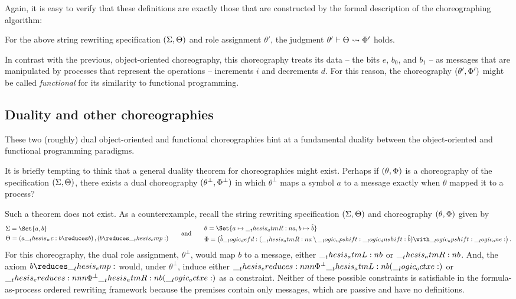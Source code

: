 Again, it is easy to verify that these definitions are exactly those that are constructed by the formal description of the choreographing algorithm:
\begin{proposition}
  For the above string rewriting specification $(\Sigma, \Theta)$ and role assignment $\theta'$, the judgment $\theta' \vdash \Theta \rightsquigarrow \Phi'$ holds.
\end{proposition}

In contrast with the previous, object-oriented choreography, this choreography treats its data -- the bits $e$, $b_0$, and $b_1$ -- as messages that are manipulated by processes that represent the operations -- increments $i$ and decrements $d$.
For this reason, the choreography $(\theta', \Phi')$ might be called \emph{functional} for its similarity to functional programming.

\clearpage
\subsection{Duality and other choreographies}

These two (roughly) dual object-oriented and functional choreographies hint at a fundamental duality between the object-oriented and functional programming paradigms.

It is briefly tempting to think that a general duality theorem for choreographies might exist.
Perhaps if $(\theta, \Phi)$ is a choreography of the specification $(\Sigma, \Theta)$, there exists a dual choreography $(\theta^{\bot}, \Phi^{\bot})$ in which $\theta^{\bot}$ maps a symbol $a$ to a message exactly when $\theta$ mapped it to a process?

Such a theorem does not exist.
As a counterexample, recall the string rewriting specification $(\Sigma, \Theta)$ and choreography $(\theta, \Phi)$ given by
\begin{equation*}
  \begin{lgathered}
    \sralph = \Set{a, b} \\
    \srsig = (a \wc b \reduces b) \,, (b \reduces \emp)
  \end{lgathered}
  \qquad\text{and}\qquad
  \begin{lgathered}
    \theta = \Set{ a \mapsto \atmR{a} , b \mapsto \defp{b} } \\
    \orsig = \bigl(\defp{b} \defd (\atmR{a} \limp \up \dn \defp{b}) \with \up \one\bigr)
    \,.
  \end{lgathered}
\end{equation*}
For this choreography, the dual role assignment, $\theta^{\bot}$, would map $b$ to a message, either $\__thesis_atmL:n {b}$ or $\__thesis_atmR:n {b}$.
And, the axiom $b \reduces \emp$ would, under $\theta^{\bot}$, induce either $\ereduces[\orsig^{\bot}]{\atmL{b}}{(\octxe)}$ or $\ereduces[\orsig^{\bot}]{\atmR{b}}{(\octxe)}$ as a constraint.
Neither of these possible constraints is satisfiable in the formula-as-process ordered rewriting framework because the premises contain only messages, which are passive and have no definitions.

